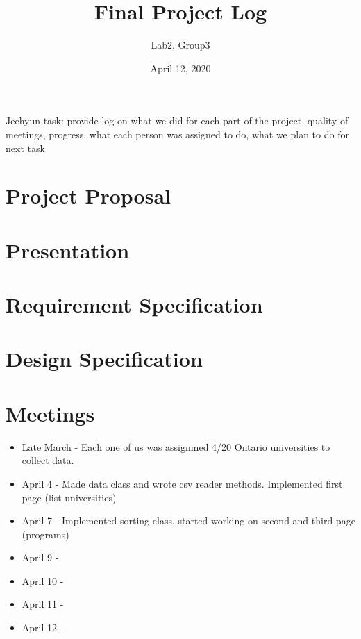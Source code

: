 \documentclass{article}
\title{Final Project Log}
\author{Lab2, Group3}
\date{April 12, 2020}
\begin{document}
\maketitle

Jeehyun task: provide log on what we did for each part of the project, quality of meetings, progress, what each person was assigned to do, what we plan to do for next task

\section{Project Proposal}

\section{Presentation}

\section{Requirement Specification}

\section{Design Specification}

\section{Meetings}

\begin{itemize} 
  \item Late March - Each one of us was assignmed 4/20 Ontario universities to collect data. 
  \item April 4 - Made data class and wrote csv reader methods. Implemented first page (list universities) 
  \item April 7 - Implemented sorting class, started working on second and third page (programs)
  \item April 9 - 
  \item April 10 -
  \item April 11 - 
  \item April 12 - 
\end{itemize}
\end{document}
